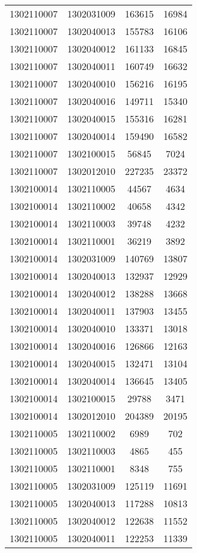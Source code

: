 \begin{longtable}[h]{llcc}
		1302110007 & 1302031009 & 163615 & 16984\\
		1302110007 & 1302040013 & 155783 & 16106\\
		1302110007 & 1302040012 & 161133 & 16845\\
		1302110007 & 1302040011 & 160749 & 16632\\
		1302110007 & 1302040010 & 156216 & 16195\\
		1302110007 & 1302040016 & 149711 & 15340\\
		1302110007 & 1302040015 & 155316 & 16281\\
		1302110007 & 1302040014 & 159490 & 16582\\
		1302110007 & 1302100015 & 56845 & 7024\\
		1302110007 & 1302012010 & 227235 & 23372\\
		1302100014 & 1302110005 & 44567 & 4634\\
		1302100014 & 1302110002 & 40658 & 4342\\
		1302100014 & 1302110003 & 39748 & 4232\\
		1302100014 & 1302110001 & 36219 & 3892\\
		1302100014 & 1302031009 & 140769 & 13807\\
		1302100014 & 1302040013 & 132937 & 12929\\
		1302100014 & 1302040012 & 138288 & 13668\\
		1302100014 & 1302040011 & 137903 & 13455\\
		1302100014 & 1302040010 & 133371 & 13018\\
		1302100014 & 1302040016 & 126866 & 12163\\
		1302100014 & 1302040015 & 132471 & 13104\\
		1302100014 & 1302040014 & 136645 & 13405\\
		1302100014 & 1302100015 & 29788 & 3471\\
		1302100014 & 1302012010 & 204389 & 20195\\
		1302110005 & 1302110002 & 6989 & 702\\
		1302110005 & 1302110003 & 4865 & 455\\
		1302110005 & 1302110001 & 8348 & 755\\
		1302110005 & 1302031009 & 125119 & 11691\\
		1302110005 & 1302040013 & 117288 & 10813\\
		1302110005 & 1302040012 & 122638 & 11552\\
		1302110005 & 1302040011 & 122253 & 11339\\

\end{longtable}
